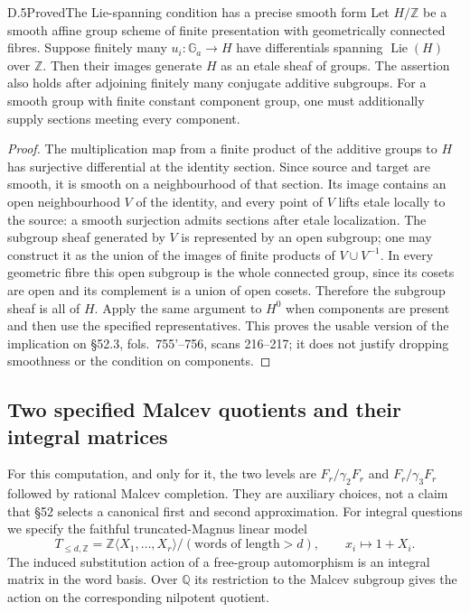 \begin{statement}{D.5}{Proved}{The Lie-spanning condition has a precise smooth form}
Let $H/\mathbb Z$ be a smooth affine group scheme of finite presentation
with geometrically connected fibres.  Suppose finitely many
$u_i:\mathbb G_a\to H$ have differentials spanning
$\operatorname{Lie}(H)$ over $\mathbb Z$.  Then their images generate
$H$ as an etale sheaf of groups.  The assertion also holds after
adjoining finitely many conjugate additive subgroups.  For a smooth
group with finite constant component group, one must additionally
supply sections meeting every component.
\end{statement}
\begin{proof}
The multiplication map from a finite product of the additive groups
to $H$ has surjective differential at the identity section.  Since
source and target are smooth, it is smooth on a neighbourhood of
that section.  Its image contains an open neighbourhood $V$ of the
identity, and every point of $V$ lifts etale locally to the source:
a smooth surjection admits sections after etale localization.
The subgroup sheaf generated by $V$ is represented by an open subgroup;
one may construct it as the union of the images of finite products
of $V\cup V^{-1}$.  In every geometric fibre this open subgroup is
the whole connected group, since its cosets are open and its complement
is a union of open cosets.  Therefore the subgroup sheaf is all of $H$.
Apply the same argument to $H^0$ when components are present and
then use the specified representatives.  This proves the usable
version of the implication on \S52.3, fols.~755'--756,
scans 216--217; it does not justify dropping smoothness or the
condition on components.
\end{proof}

\subsection{Two specified Malcev quotients and their integral matrices}

For this computation, and only for it, the two levels are
$F_r/\gamma_2F_r$ and $F_r/\gamma_3F_r$ followed by rational Malcev
completion.  They are auxiliary choices, not a claim that \S52
selects a canonical first and second approximation.  For integral
questions we specify the faithful truncated-Magnus linear model
\[
 T_{\leq d,\mathbb Z}
   =\mathbb Z\langle X_1,\ldots,X_r\rangle/(\text{words of length}>d),
 \qquad x_i\longmapsto1+X_i.
\]
The induced substitution action of a free-group automorphism is an
integral matrix in the word basis.  Over $\mathbb Q$ its restriction
to the Malcev subgroup gives the action on the corresponding
nilpotent quotient.

